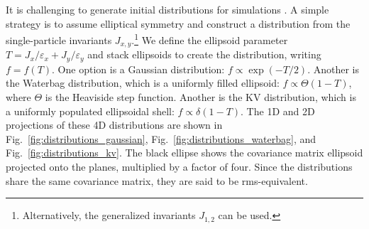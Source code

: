 It is challenging to generate initial distributions for simulations \cite{Lund2009}. A simple strategy is to assume elliptical symmetry and construct a distribution from the single-particle invariants $J_{x,y}$.\footnote{Alternatively, the generalized invariants $J_{1, 2}$ can be used.} We define the ellipsoid parameter $T = {J_x}/{\varepsilon_x} + {J_y}/{\varepsilon_y}$ and stack ellipsoids to create the distribution, writing $f = f(T)$. One option is a Gaussian distribution: $f \propto \exp(-T/2)$. Another is the Waterbag distribution, which is a uniformly filled ellipsoid: $f \propto \Theta(1 - T)$, where $\Theta$ is the Heaviside step function. Another is the KV distribution, which is a uniformly populated ellipsoidal shell: $f \propto \delta(1 - T)$. The 1D and 2D projections of these 4D distributions are shown in Fig.~\ref{fig:distributions_gaussian}, Fig.~\ref{fig:distributions_waterbag}, and Fig.~\ref{fig:distributions_kv}. The black ellipse shows the covariance matrix ellipsoid projected onto the planes, multiplied by a factor of four. Since the distributions share the same covariance matrix, they are said to be rms-equivalent.
%
